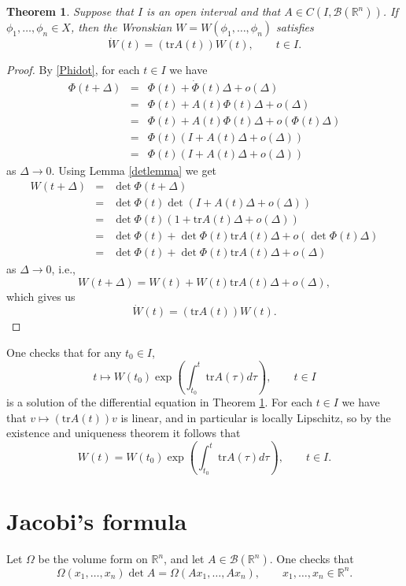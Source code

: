 \documentclass{article}
\newcommand{\tr}{\textrm{tr}}
\newtheorem{theorem}{Theorem}
\begin{document}
\begin{theorem}
Suppose that $I$ is an open interval and that $A \in C(I, \mathscr{B}(\mathbb{R}^n))$.
If $\phi_1,\ldots,\phi_n \in X$,
then the Wronskian $W=W(\phi_1,\ldots,\phi_n)$ satisfies
\[
\dot{W}(t)=(\tr A(t)) W(t) , \qquad t \in I.
\]
\label{abelsformula}
\end{theorem}
\begin{proof}
By \eqref{Phidot}, for each $t \in I$ we have
\begin{eqnarray*}
\Phi(t+\Delta) &=& \Phi(t) + \dot{\Phi}(t) \Delta + o(\Delta)\\
&=&\Phi(t)+A(t)\Phi(t)\Delta + o(\Delta)\\
&=&\Phi(t)+A(t)\Phi(t) \Delta + o(\Phi(t) \Delta)\\
&=&\Phi(t) (I+ A(t) \Delta + o(\Delta))\\
&=&\Phi(t) (I+ A(t) \Delta + o(\Delta) )
\end{eqnarray*}
as $\Delta \to 0$. Using Lemma \ref{detlemma} we get
\begin{eqnarray*}
W(t+\Delta)&=&\det \Phi(t+\Delta)\\
&=&\det \Phi(t) \det (I+A(t)\Delta+o(\Delta))\\
&=&\det \Phi(t)(1+ \tr A(t)  \Delta + o(\Delta))\\
&=&\det \Phi(t) + \det \Phi(t) \tr A(t)\Delta + o\left( \det \Phi(t) \Delta \right)\\
&=&\det \Phi(t) + \det \Phi(t) \tr A(t)\Delta + o(\Delta)
\end{eqnarray*}
as $\Delta \to 0$, i.e.,
\[
W(t+\Delta) = W(t) +W(t) \tr A(t) \Delta + o(\Delta),
\]
which gives us
\[
\dot{W}(t) = (\tr A(t)) W(t).
\]
\end{proof}

One checks that for any $t_0 \in I$, 
\[
t \mapsto W(t_0) \exp\left( \int_{t_0}^t \tr A(\tau) d\tau \right), \qquad t \in I
\]
is a solution of the differential equation in Theorem \ref{abelsformula}. For each $t \in I$ we have that $v \mapsto (\tr A(t))v$ is linear, and in particular
is locally Lipschitz, so by the existence and uniqueness theorem it follows that
\[
W(t) =W(t_0)  \exp\left( \int_{t_0}^t \tr A(\tau) d\tau \right) , \qquad t \in I.
\]



\section{Jacobi's formula}
Let $\Omega$ be the volume form on $\mathbb{R}^n$, and let $A \in \mathscr{B}(\mathbb{R}^n)$.  One checks that
\begin{equation}
\Omega(x_1,\ldots,x_n) \det A = \Omega(Ax_1,\ldots,Ax_n), \qquad x_1,\ldots,x_n \in \mathbb{R}^n.
\label{Adet}
\end{equation}
\end{document}
